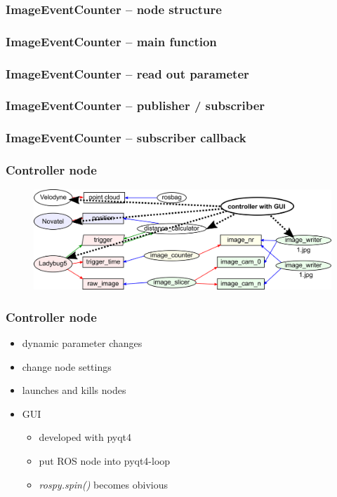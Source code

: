 \documentclass[aspectratio=169]{beamer}
\begin{document}
\begin{frame}
 \frametitle{ImageEventCounter -- node structure}
 \lstOne
\end{frame}

\begin{frame}
 \frametitle{ImageEventCounter -- main function}
 \lstTwo
\end{frame}

\begin{frame}
 \frametitle{ImageEventCounter -- read out parameter}
 \lstThree
\end{frame}

\begin{frame}
 \frametitle{ImageEventCounter -- publisher / subscriber}
 \lstFour
\end{frame}

\begin{frame}
 \frametitle{ImageEventCounter -- subscriber callback}
 \lstFive
\end{frame}

  \begin{frame}
   \frametitle{Controller node}
    
    \begin{figure}[h]
      \centering
      \includegraphics[width=13.5cm]{./Abbildungen/ROSImageCapturingGUI.png}
    \end{figure}

  \end{frame}
  
  \begin{frame}
   \frametitle{Controller node}
    
    \begin{itemize}
     \item dynamic parameter changes
     \item change node settings
     \item launches and kills nodes
     \item GUI 
     \begin{itemize}
      \item developed with pyqt4
      \item put ROS node into pyqt4-loop
      \item \textit{rospy.spin()} becomes obivious
    \end{itemize}
    \end{itemize}

  \end{frame}
  
\end{document}
